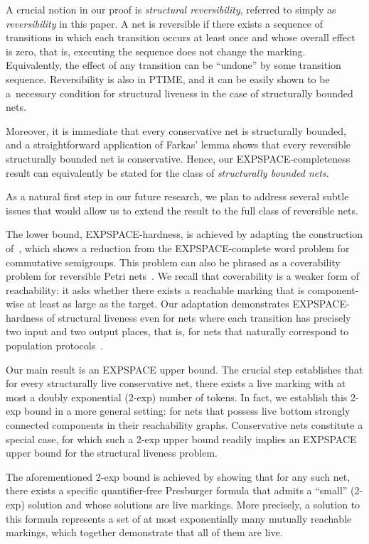 A crucial notion in our proof is \emph{structural reversibility},
referred to simply as \emph{reversibility} in this paper. 
A net is reversible if there exists a sequence of transitions in which
each transition occurs at least once and whose overall effect is zero,
that is, executing the sequence does not change the marking.
Equivalently, the effect of any transition can be ``undone'' by some transition sequence.
Reversibility is also in PTIME, and it can be easily shown to be a~necessary condition for structural liveness in the case of structurally bounded nets.

Moreover, it is immediate that every conservative net is structurally bounded, and a straightforward application of Farkas’ lemma shows that every reversible structurally bounded net is conservative. Hence, our EXPSPACE-completeness result can equivalently be stated for the class of \emph{structurally bounded nets}.

As a natural first step in our future research, we plan to address several subtle issues that would allow us to extend the result to the full class of reversible nets.

The lower bound, EXPSPACE-hardness, is achieved by adapting the
construction of~\cite{DBLP:journals/acta/JancarP19}, which shows a
reduction from the EXPSPACE-complete word problem for commutative
semigroups. This problem can also be phrased as a coverability problem
for reversible Petri nets~\cite{DBLP:conf/stoc/CardozaLM76,
mayr1982complexity, DBLP:journals/jc/Mayr97}. We recall that
coverability is a weaker form of reachability: it asks whether there
exists a reachable marking that is component-wise at least as large as the target. Our adaptation demonstrates EXPSPACE-hardness of structural liveness even for nets where each transition has precisely two input and 
two output places, that is, for nets that naturally correspond to population protocols~\cite{DBLP:journals/dc/AngluinADFP06}.


Our main result is an EXPSPACE upper bound. The crucial step
establishes
that for every structurally live conservative net, there exists a live
marking with at most a doubly exponential (2-exp) number of tokens.
In fact, we establish this 2-exp bound in a more general setting: for nets
that possess live bottom strongly connected components in their
reachability graphs. Conservative nets constitute a
special case, for which such a 2-exp upper bound readily implies an
EXPSPACE upper bound for the structural liveness problem.

The aforementioned 2-exp bound is achieved by showing that for any
such net, there exists a specific quantifier-free
Presburger formula that admits a ``small'' (2-exp) solution and whose
solutions are live markings. More precisely, a solution to this
formula represents a set of at most exponentially many mutually
reachable markings, which together demonstrate that all of them are live.

